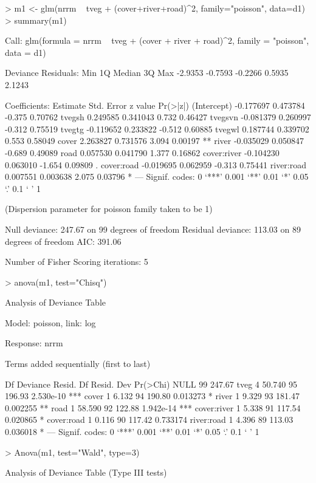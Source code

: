 \documentclass{article}
\begin{document}
\begin{Schunk}
\begin{Sinput}
> m1 <- glm(nrrm ~ tveg + (cover+river+road)^2, family="poisson", data=d1)
> summary(m1)
\end{Sinput}
\begin{Soutput}
Call:
glm(formula = nrrm ~ tveg + (cover + river + road)^2, family = "poisson", 
    data = d1)

Deviance Residuals: 
    Min       1Q   Median       3Q      Max  
-2.9353  -0.7593  -0.2266   0.5935   2.1243  

Coefficients:
             Estimate Std. Error z value Pr(>|z|)   
(Intercept) -0.177697   0.473784  -0.375  0.70762   
tvegsh       0.249585   0.341043   0.732  0.46427   
tvegsvn     -0.081379   0.260997  -0.312  0.75519   
tvegtg      -0.119652   0.233822  -0.512  0.60885   
tvegwl       0.187744   0.339702   0.553  0.58049   
cover        2.263827   0.731576   3.094  0.00197 **
river       -0.035029   0.050847  -0.689  0.49089   
road         0.057530   0.041790   1.377  0.16862   
cover:river -0.104230   0.063010  -1.654  0.09809 . 
cover:road  -0.019695   0.062959  -0.313  0.75441   
river:road   0.007551   0.003638   2.075  0.03796 * 
---
Signif. codes:  0 ‘***’ 0.001 ‘**’ 0.01 ‘*’ 0.05 ‘.’ 0.1 ‘ ’ 1

(Dispersion parameter for poisson family taken to be 1)

    Null deviance: 247.67  on 99  degrees of freedom
Residual deviance: 113.03  on 89  degrees of freedom
AIC: 391.06

Number of Fisher Scoring iterations: 5
\end{Soutput}
\begin{Sinput}
> anova(m1, test="Chisq")
\end{Sinput}
\begin{Soutput}
Analysis of Deviance Table

Model: poisson, link: log

Response: nrrm

Terms added sequentially (first to last)


            Df Deviance Resid. Df Resid. Dev  Pr(>Chi)    
NULL                           99     247.67              
tveg         4   50.740        95     196.93 2.530e-10 ***
cover        1    6.132        94     190.80  0.013273 *  
river        1    9.329        93     181.47  0.002255 ** 
road         1   58.590        92     122.88 1.942e-14 ***
cover:river  1    5.338        91     117.54  0.020865 *  
cover:road   1    0.116        90     117.42  0.733174    
river:road   1    4.396        89     113.03  0.036018 *  
---
Signif. codes:  0 ‘***’ 0.001 ‘**’ 0.01 ‘*’ 0.05 ‘.’ 0.1 ‘ ’ 1
\end{Soutput}
\begin{Sinput}
> Anova(m1, test="Wald", type=3)
\end{Sinput}
\begin{Soutput}
Analysis of Deviance Table (Type III tests)


\end{Soutput}
\end{Schunk}
\end{document}
